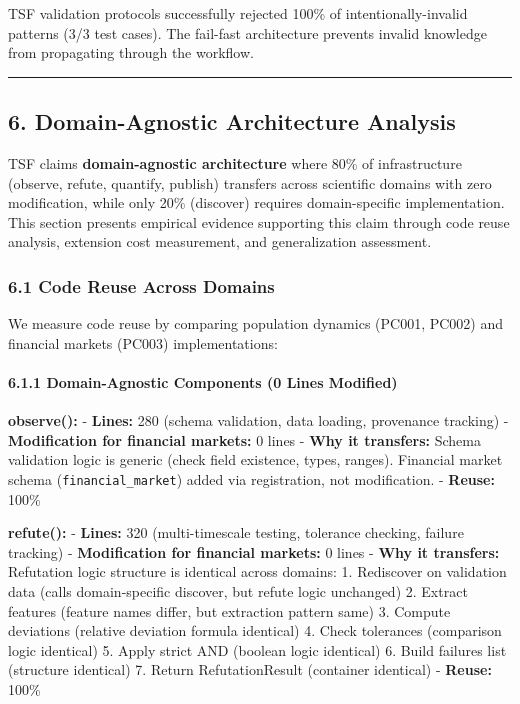 \documentclass[
]{article}
\begin{document}
TSF validation protocols successfully rejected 100\% of
intentionally-invalid patterns (3/3 test cases). The fail-fast
architecture prevents invalid knowledge from propagating through the
workflow.

\begin{center}\rule{0.5\linewidth}{0.5pt}\end{center}

\subsection{6. Domain-Agnostic Architecture
Analysis}\label{domain-agnostic-architecture-analysis}

TSF claims \textbf{domain-agnostic architecture} where 80\% of
infrastructure (observe, refute, quantify, publish) transfers across
scientific domains with zero modification, while only 20\% (discover)
requires domain-specific implementation. This section presents empirical
evidence supporting this claim through code reuse analysis, extension
cost measurement, and generalization assessment.

\subsubsection{6.1 Code Reuse Across
Domains}\label{code-reuse-across-domains}

We measure code reuse by comparing population dynamics (PC001, PC002)
and financial markets (PC003) implementations:

\paragraph{6.1.1 Domain-Agnostic Components (0 Lines
Modified)}\label{domain-agnostic-components-0-lines-modified}

\textbf{observe():} - \textbf{Lines:} 280 (schema validation, data
loading, provenance tracking) - \textbf{Modification for financial
markets:} 0 lines - \textbf{Why it transfers:} Schema validation logic
is generic (check field existence, types, ranges). Financial market
schema (\texttt{financial\_market}) added via registration, not
modification. - \textbf{Reuse:} 100\%

\textbf{refute():} - \textbf{Lines:} 320 (multi-timescale testing,
tolerance checking, failure tracking) - \textbf{Modification for
financial markets:} 0 lines - \textbf{Why it transfers:} Refutation
logic structure is identical across domains: 1. Rediscover on validation
data (calls domain-specific discover, but refute logic unchanged) 2.
Extract features (feature names differ, but extraction pattern same) 3.
Compute deviations (relative deviation formula identical) 4. Check
tolerances (comparison logic identical) 5. Apply strict AND (boolean
logic identical) 6. Build failures list (structure identical) 7. Return
RefutationResult (container identical) - \textbf{Reuse:} 100\%
\end{document}

